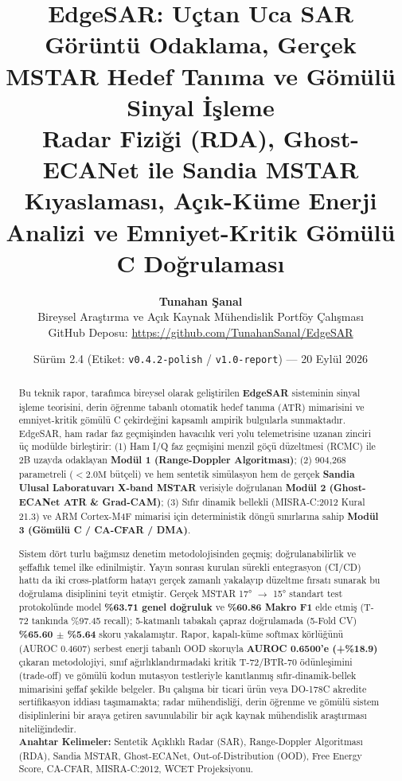 \documentclass[11pt,a4paper]{article}
\title{
    \vspace{-0.5cm}
    \LARGE \textbf{\textcolor{navyblue}{EdgeSAR: Uçtan Uca SAR Görüntü Odaklama, Gerçek MSTAR Hedef Tanıma ve Gömülü Sinyal İşleme}}\\[0.8cm]
    \large \textbf{\textcolor{steelcyan}{Radar Fiziği (RDA), Ghost-ECANet ile Sandia MSTAR Kıyaslaması, Açık-Küme Enerji Analizi ve Emniyet-Kritik Gömülü C Doğrulaması}}
}
\author{
    \normalsize \textbf{Tunahan Şanal} \\
    \small Bireysel Araştırma ve Açık Kaynak Mühendislik Portföy Çalışması \\
    \small GitHub Deposu: \url{https://github.com/TunahanSanal/EdgeSAR}
}
\date{\small Sürüm 2.4 (Etiket: \texttt{v0.4.2-polish} / \texttt{v1.0-report}) --- 20 Eylül 2026}
\begin{document}
\maketitle

\begin{abstract}
\noindent\small
Bu teknik rapor, tarafımca bireysel olarak geliştirilen \textbf{EdgeSAR} sisteminin sinyal işleme teorisini, derin öğrenme tabanlı otomatik hedef tanıma (ATR) mimarisini ve emniyet-kritik gömülü C çekirdeğini kapsamlı ampirik bulgularla sunmaktadır. EdgeSAR, ham radar faz geçmişinden havacılık veri yolu telemetrisine uzanan zinciri üç modülde birleştirir: (1) Ham I/Q faz geçmişini menzil göçü düzeltmesi (RCMC) ile 2B uzayda odaklayan \textbf{Modül 1 (Range-Doppler Algoritması)}; (2) 904,268 parametreli ($<2.0\text{M}$ bütçeli) ve hem sentetik simülasyon hem de gerçek \textbf{Sandia Ulusal Laboratuvarı X-band MSTAR} verisiyle doğrulanan \textbf{Modül 2 (Ghost-ECANet ATR \& Grad-CAM)}; (3) Sıfır dinamik bellekli (MISRA-C:2012 Kural 21.3) ve ARM Cortex-M4F mimarisi için deterministik döngü sınırlarına sahip \textbf{Modül 3 (Gömülü C / CA-CFAR / DMA)}. 

Sistem dört turlu bağımsız denetim metodolojisinden geçmiş; doğrulanabilirlik ve şeffaflık temel ilke edinilmiştir. Yayın sonrası kurulan sürekli entegrasyon (CI/CD) hattı da iki cross-platform hatayı gerçek zamanlı yakalayıp düzeltme fırsatı sunarak bu doğrulama disiplinini teyit etmiştir. Gerçek MSTAR 17° $\to$ 15° standart test protokolünde model \textbf{\%63.71 genel doğruluk} ve \textbf{\%60.86 Makro F1} elde etmiş (T-72 tankında \%97.45 recall); 5-katmanlı tabakalı çapraz doğrulamada (5-Fold CV) \textbf{\%65.60 $\pm$ \%5.64} skoru yakalamıştır. Rapor, kapalı-küme softmax körlüğünü (AUROC 0.4607) serbest enerji tabanlı OOD skoruyla \textbf{AUROC 0.6500'e (+\%18.9)} çıkaran metodolojiyi, sınıf ağırlıklandırmadaki kritik T-72/BTR-70 ödünleşimini (trade-off) ve gömülü kodun mutasyon testleriyle kanıtlanmış sıfır-dinamik-bellek mimarisini şeffaf şekilde belgeler. Bu çalışma bir ticari ürün veya DO-178C akredite sertifikasyon iddiası taşımamakta; radar mühendisliği, derin öğrenme ve gömülü sistem disiplinlerini bir araya getiren savunulabilir bir açık kaynak mühendislik araştırması niteliğindedir.\\

\noindent\small\textbf{Anahtar Kelimeler:} Sentetik Açıklıklı Radar (SAR), Range-Doppler Algoritması (RDA), Sandia MSTAR, Ghost-ECANet, Out-of-Distribution (OOD), Free Energy Score, CA-CFAR, MISRA-C:2012, WCET Projeksiyonu.
\end{abstract}
\end{document}
